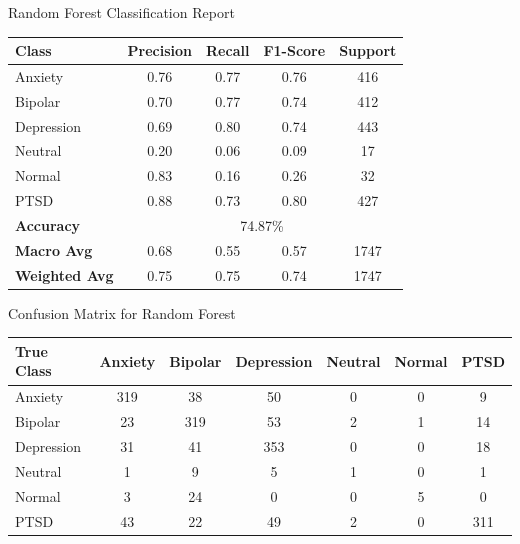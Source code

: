 \begin{center}
    Random Forest Classification Report
\begin{tabular}{|l|c|c|c|c|}
\hline
\textbf{Class} & \textbf{Precision} & \textbf{Recall} & \textbf{F1-Score} & \textbf{Support} \\ \hline
Anxiety        & 0.76               & 0.77            & 0.76              & 416              \\ \hline
Bipolar        & 0.70               & 0.77            & 0.74              & 412              \\ \hline
Depression     & 0.69               & 0.80            & 0.74              & 443              \\ \hline
Neutral        & 0.20               & 0.06            & 0.09              & 17               \\ \hline
Normal         & 0.83               & 0.16            & 0.26              & 32               \\ \hline
PTSD           & 0.88               & 0.73            & 0.80              & 427              \\ \hline
\textbf{Accuracy} & \multicolumn{4}{|c|}{74.87\%} \\ \hline
\textbf{Macro Avg} & 0.68            & 0.55            & 0.57              & 1747             \\ \hline
\textbf{Weighted Avg} & 0.75         & 0.75            & 0.74              & 1747             \\ \hline
\end{tabular}

\vspace{0.25in}

Confusion Matrix for Random Forest
\begin{tabular}{|l|c|c|c|c|c|c|}
\hline
\textbf{True Class} & \textbf{Anxiety} & \textbf{Bipolar} & \textbf{Depression} & \textbf{Neutral} & \textbf{Normal} & \textbf{PTSD} \\ \hline
Anxiety             & 319              & 38               & 50                  & 0                & 0               & 9             \\ \hline
Bipolar             & 23               & 319              & 53                  & 2                & 1               & 14            \\ \hline
Depression          & 31               & 41               & 353                 & 0                & 0               & 18            \\ \hline
Neutral             & 1                & 9                & 5                   & 1                & 0               & 1             \\ \hline
Normal              & 3                & 24               & 0                   & 0                & 5               & 0             \\ \hline
PTSD                & 43               & 22               & 49                  & 2                & 0               & 311           \\ \hline
\end{tabular}    
\end{center}

